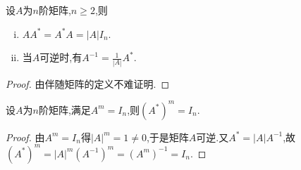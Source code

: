 \documentclass[lang=cn,newtx,10pt,scheme=chinese]{elegantbook}
\begin{document}
\begin{theorem}\label{theorem:伴随矩阵的基本性质}
设$A$为$n$阶矩阵,$n\geq 2$,则
\begin{enumerate}[(i)]
\item $AA^*=A^*A=\left| A \right|I_n$.
\item\label{伴随矩阵基本性质2} 当$A$可逆时,有$A^{-1}=\frac{1}{\left| A \right|}A^*$.
\end{enumerate}
\end{theorem}
\begin{proof}
由伴随矩阵的定义不难证明.
\end{proof}

\begin{proposition}
设\(A\)为\(n\)阶矩阵,满足\(A^m = I_n\),则\((A^*)^m = I_n\).
\end{proposition}
\begin{proof}
由\(A^m = I_n\)得\(|A|^m = 1\ne 0\),于是矩阵$A$可逆.又\(A^* = |A|A^{-1}\),故$(A^*)^m = |A|^m(A^{-1})^m = (A^m)^{-1} = I_n$.
\end{proof}
\end{document}
